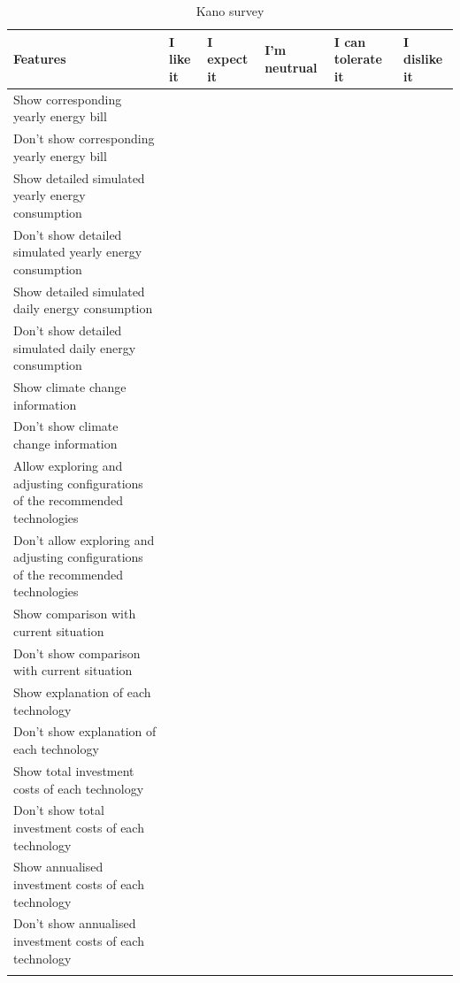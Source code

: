 \begin{center}
  \small
  \begin{longtable}{ | p{} | p{} | p{} | p{} | p{} | p{} |}
    \hline
    Features & I like it & I expect it & I'm neutrual & I can tolerate it & I dislike it \\
    \hline
    Show corresponding yearly energy bill &&&&& \\
    \hline
    Don't show corresponding yearly energy bill &&&&& \\
    \hline
    Show detailed simulated yearly energy consumption &&&&& \\
    \hline
    Don't show detailed simulated yearly energy consumption &&&&& \\
    \hline
    Show detailed simulated daily energy consumption &&&&& \\
    \hline
    Don't show detailed simulated daily energy consumption &&&&& \\
    \hline
    Show climate change information &&&&& \\
    \hline
    Don't show climate change information &&&&& \\
    \hline
    Allow exploring and adjusting configurations of the recommended technologies &&&&& \\
    \hline
    Don't allow exploring and adjusting configurations of the recommended technologies &&&&& \\
    \hline
    Show comparison with current situation &&&&& \\
    \hline
    Don't show comparison with current situation &&&&& \\
    \hline
    Show explanation of each technology &&&&& \\
    \hline
    Don't show explanation of each technology &&&&& \\
    \hline
    Show total investment costs of each technology &&&&& \\
    \hline
    Don't show total investment costs of each technology &&&&& \\
    \hline
    Show annualised investment costs of each technology &&&&& \\
    \hline
    Don't show annualised investment costs of each technology &&&&& \\
    \hline
  \caption{Kano survey}
  \label{tab:kanomodel}
  \end{longtable}
\end{center}


